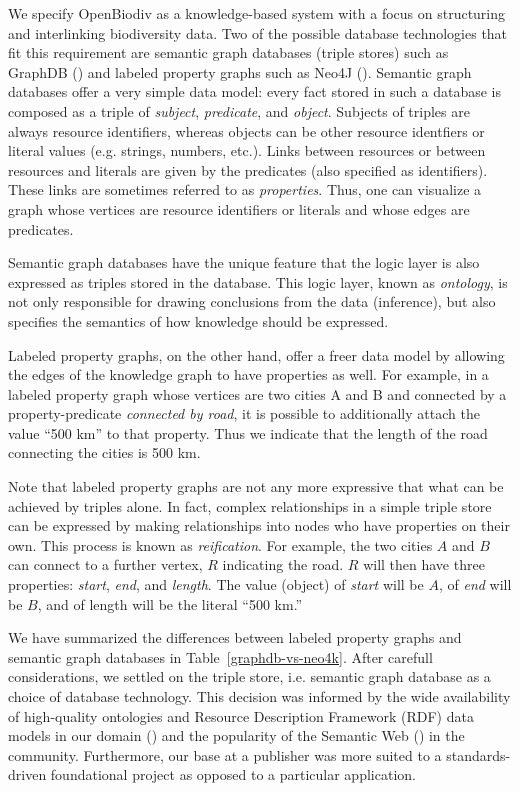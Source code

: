 We specify OpenBiodiv as a knowledge-based system with a focus on structuring and interlinking biodiversity data. Two of the possible database technologies that fit this requirement are semantic graph databases (triple stores) such as GraphDB (\cite{ontotext_graphdb_2018}) and labeled property graphs such as Neo4J (\cite{neo4j_developers_neo4j_2012}).  Semantic graph databases offer a very simple data model: every fact stored in such a database is composed as a triple of \emph{subject}, \emph{predicate}, and \emph{object}. Subjects of triples are always resource identifiers, whereas objects can be other resource identfiers or literal values (e.g. strings, numbers, etc.).  Links between resources or between resources and literals are given by the predicates (also specified as identifiers). These links are sometimes referred to as \emph{properties}. Thus, one can visualize a graph whose vertices are resource identifiers or literals and whose edges are predicates.

Semantic graph databases have the unique feature that the logic layer is also expressed as triples stored in the database. This logic layer, known as \emph{ontology}, is not only responsible for drawing conclusions from the data (inference), but also specifies the semantics of how knowledge should be expressed.

Labeled property graphs, on the other hand, offer a freer data model by allowing the edges of the knowledge graph to have properties as well. For example, in a labeled property graph whose vertices are two cities A and B and connected by a property-predicate \emph{connected by road}, it is possible to additionally attach the value ``500 km'' to that property. Thus we indicate that the length of the road connecting the cities is 500 km.

Note that labeled property graphs are not any more expressive that what can be achieved by triples alone. In fact, complex relationships in a simple triple store can be expressed by making relationships into nodes who have properties on their own. This process is known as \emph{reification}. For example, the two cities $A$ and $B$ can connect to a further vertex, $R$ indicating the road. $R$ will then have three properties: \emph{start}, \emph{end}, and \emph{length}. The value (object) of \emph{start} will be $A$, of \emph{end} will be $B$, and of length will be the literal ``500 km.''

We have summarized the differences between labeled property graphs and semantic graph databases in Table~\ref{graphdb-vs-neo4k}. After carefull considerations, we settled on the triple store, i.e. semantic graph database as a choice of database technology. This decision was informed by the wide availability of high-quality ontologies and Resource Description Framework (RDF) data models in our domain (\cite{baskauf_darwin-sw:_2016,peroni_semantic_2014}) and the popularity of the Semantic Web (\cite{berners-lee_semantic_2001}) in the community. Furthermore, our base at a publisher was more suited to a standards-driven foundational project as opposed to a particular application.

